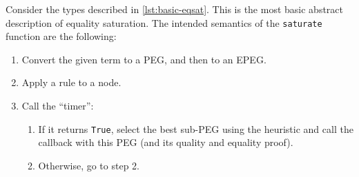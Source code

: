 \documentclass[11pt]{report}
\newcommand{\haskell}[1]{\texttt{#1}}
\begin{document}
Consider the types described in \autoref{lst:basic-eqsat}. This is the most
basic abstract description of equality saturation. The intended semantics of the
\haskell{saturate} function are the following:

\vspace{0.5em}

\begin{enumerate}
\item Convert the given term to a PEG, and then to an EPEG.
\item Apply a rule to a node.
\item {%
  Call the ``timer'':
  \begin{enumerate}
  \item {%
    If it returns \texttt{True}, select the best sub-PEG using the heuristic and
    call the callback with this PEG (and its quality and equality proof).
  }
  \item {%
    Otherwise, go to step 2.
  }
  \end{enumerate}
}
\end{enumerate}
\end{document}
